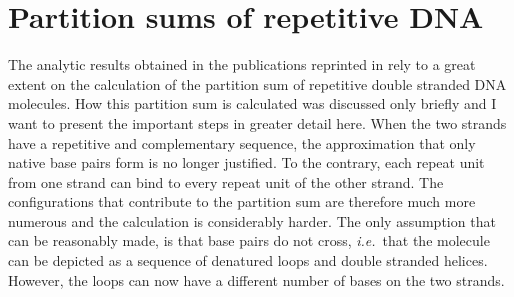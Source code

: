 \chapter{Partition sums of repetitive DNA}
\label{app:DNA_partitionsums}
The analytic results obtained in the publications reprinted in  rely to a great extent
on the calculation of the partition sum of repetitive double stranded DNA molecules. How this partition sum
is calculated was discussed only briefly and I want to present the important steps in greater detail here.
When the two strands have a repetitive and complementary sequence, the approximation that
only native base pairs form is no longer justified. To the contrary, each repeat unit from one strand 
can bind to every repeat unit of the other strand. The configurations that contribute to the partition sum  
are therefore much more numerous and the calculation is considerably harder.
The only assumption that can be reasonably made, is that base pairs do not cross, \emph{i.e.}~that 
the molecule can be depicted as a sequence of denatured loops and double stranded helices. However, the
loops can now have a different number of bases on the two strands. 

